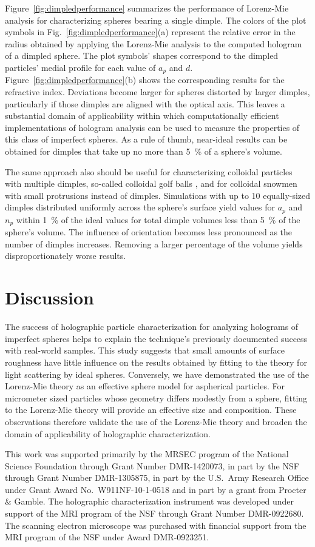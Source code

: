 Figure~\ref{fig:dimpledperformance} summarizes the performance of
Lorenz-Mie analysis for characterizing spheres bearing a single
dimple.
The colors of the plot symbols
in Fig.~\ref{fig:dimpledperformance}(a) represent the relative
error in the radius obtained by applying the Lorenz-Mie analysis
to the computed hologram of a dimpled sphere.
The plot symbols' shapes correspond to the
dimpled particles' medial profile for each value of $a_p$ and $d$.
Figure~\ref{fig:dimpledperformance}(b) shows the corresponding
results for the refractive index.
Deviations become larger for spheres distorted by larger dimples,
particularly if those dimples are aligned with the optical axis.
This leaves a substantial domain of applicability within which
computationally efficient implementations of hologram analysis
can be used to measure the properties of this class of
imperfect spheres.
As a rule of thumb, near-ideal results can be obtained for dimples
that take up no more than \SI{5}{\percent} of a sphere's volume.

The same approach also should be useful for characterizing
colloidal particles with multiple dimples, so-called colloidal golf
balls \cite{dai13},
and for colloidal snowmen \cite{chaturvedi12}
with small protrusions instead of dimples.
Simulations with up to 10 equally-sized dimples distributed
uniformly across the sphere's surface yield values for
$a_p$ and $n_p$ within \SI{1}{\percent} of the ideal values for total dimple
volumes less than \SI{5}{\percent} of the sphere's volume.
The influence of orientation becomes less pronounced as the number
of dimples increases.
Removing a larger percentage of the volume 
yields disproportionately worse results.

\section{Discussion}

The success of holographic particle characterization for analyzing
holograms of imperfect spheres helps to explain the technique's
previously documented success with real-world samples.
This study suggests that small amounts of surface roughness have
little influence on the results obtained by fitting to the theory
for light scattering by ideal spheres.
Conversely, we have demonstrated the use of the Lorenz-Mie theory
as an effective sphere model for aspherical particles. For micrometer
sized particles whose geometry differs modestly from a sphere,
fitting to the Lorenz-Mie theory will provide an effective size and
composition.
These observations therefore validate the use of the Lorenz-Mie theory
and broaden the domain of applicability of holographic characterization.

This work was supported primarily by the MRSEC program of the National
Science Foundation through Grant Number DMR-1420073, in part by the NSF
through Grant Number DMR-1305875, in part by
the U.S.\ Army Research Office under Grant Award No.\ W911NF-10-1-0518
and in part by a grant from Procter \& Gamble.
The holographic characterization instrument
was developed under support of the MRI program of the NSF through Grant Number
DMR-0922680.  The scanning electron microscope was purchased with financial
support from the MRI program of the NSF under Award DMR-0923251.

